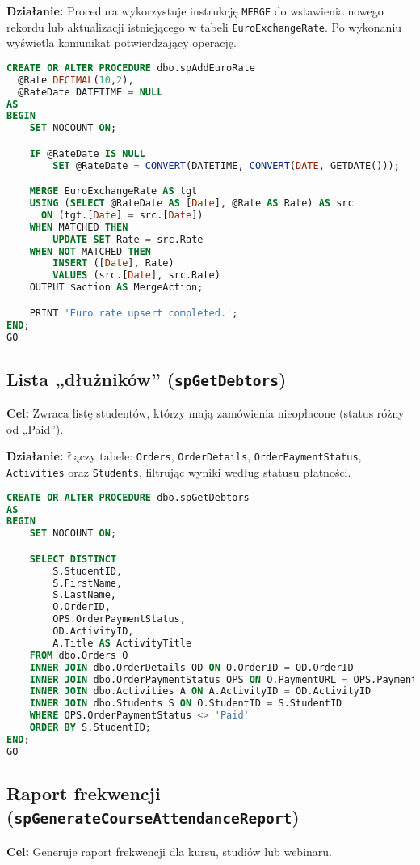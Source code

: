 \documentclass[12pt]{article}
\begin{document}
\textbf{Działanie:} Procedura wykorzystuje instrukcję \verb|MERGE| do wstawienia nowego rekordu lub aktualizacji istniejącego w tabeli \verb|EuroExchangeRate|. Po wykonaniu wyświetla komunikat potwierdzający operację.

\begin{lstlisting}[language=SQL]
CREATE OR ALTER PROCEDURE dbo.spAddEuroRate
  @Rate DECIMAL(10,2),
  @RateDate DATETIME = NULL
AS
BEGIN
    SET NOCOUNT ON;

    IF @RateDate IS NULL
        SET @RateDate = CONVERT(DATETIME, CONVERT(DATE, GETDATE()));

    MERGE EuroExchangeRate AS tgt
    USING (SELECT @RateDate AS [Date], @Rate AS Rate) AS src
      ON (tgt.[Date] = src.[Date])
    WHEN MATCHED THEN
        UPDATE SET Rate = src.Rate
    WHEN NOT MATCHED THEN
        INSERT ([Date], Rate)
        VALUES (src.[Date], src.Rate)
    OUTPUT $action AS MergeAction;

    PRINT 'Euro rate upsert completed.';
END;
GO
\end{lstlisting}

\newpage
\subsection{Lista „dłużników” (\texttt{spGetDebtors})}
\textbf{Cel:} Zwraca listę studentów, którzy mają zamówienia nieopłacone (status różny od „Paid”).

\textbf{Działanie:} Łączy tabele: \verb|Orders|, \verb|OrderDetails|, \verb|OrderPaymentStatus|, \verb|Activities| oraz \verb|Students|, filtrując wyniki według statusu płatności.

\begin{lstlisting}[language=SQL]
CREATE OR ALTER PROCEDURE dbo.spGetDebtors
AS
BEGIN
    SET NOCOUNT ON;

    SELECT DISTINCT
        S.StudentID,
        S.FirstName,
        S.LastName,
        O.OrderID,
        OPS.OrderPaymentStatus,
        OD.ActivityID,
        A.Title AS ActivityTitle
    FROM dbo.Orders O
    INNER JOIN dbo.OrderDetails OD ON O.OrderID = OD.OrderID
    INNER JOIN dbo.OrderPaymentStatus OPS ON O.PaymentURL = OPS.PaymentURL
    INNER JOIN dbo.Activities A ON A.ActivityID = OD.ActivityID
    INNER JOIN dbo.Students S ON O.StudentID = S.StudentID
    WHERE OPS.OrderPaymentStatus <> 'Paid'
    ORDER BY S.StudentID;
END;
GO
\end{lstlisting}

\newpage
\subsection{Raport frekwencji (\texttt{spGenerateCourseAttendanceReport})}
\textbf{Cel:} Generuje raport frekwencji dla kursu, studiów lub webinaru.
\end{document}
